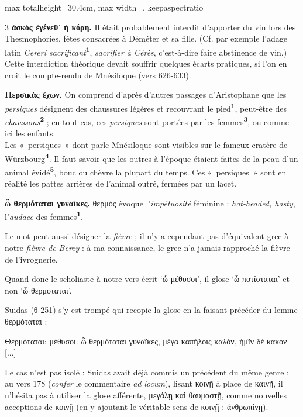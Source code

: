 \documentclass[11pt,twoside]{book}
\newcommand{\italique}[1]{\textit{#1}}
\newcommand{\citComm}[1]{\begin{quoting}[vskip=0.4pt,leftmargin=0.7em,rightmargin=0.2em]#1\end{quoting}}
\newcommand{\latin}[1]{\textit{#1}}
\newcommand{\anglais}[1]{\textit{#1}}
\newcommand{\marqueur}[1]{\textsuperscript{\color{rubricRed}\textbf{#1}}}
\begin{document}
\begin{adjustbox}{max totalheight=30.4cm, max width=\textwidth, keepaspectratio}
\begin{minipage}{\textwidth}
{\begin{multicols}{3}
 \textbf{ἀσκὸς ἐγένεθ᾽ ἡ κόρη.} Il était probablement interdit d'apporter du vin lors des Thesmophories, fêtes consacrées à Déméter et sa fille. (Cf. par exemple l'adage latin \latin{Cereri sacrificant}\marqueur{1}, \italique{sacrifier à Cérès}, c'est-à-dire faire abstinence de vin.) Cette interdiction théorique devait souffrir quelques écarts pratiques, si l'on en croit le compte-rendu de Mnésiloque (vers 626-633).
\par\vspace{1.5pt}
 \textbf{Περσικὰς ἔχων.} On comprend d'après d'autres passages d'Aristophane que les \italique{persiques} désignent des chaussures légères et recouvrant le pied\marqueur{1}, peut-être des \italique{chaussons}\marqueur{2} ; en tout cas, ces \italique{persiques} sont portées par les femmes\marqueur{3}, ou comme ici les enfants.\\ Les «~persiques~» dont parle Mnésiloque sont visibles sur le fameux cratère de Würzbourg\marqueur{4}. Il faut savoir que les outres à l'époque étaient faites de la peau d'un animal évidé\marqueur{5}, bouc ou chèvre la plupart du temps. Ces «~persiques~» sont en réalité les pattes arrières de l'animal outré, fermées par un lacet.
\par\vspace{1.5pt}
 \textbf{ὦ θερμόταται γυναῖκες.} θερμός évoque l'\italique{impétuosité} féminine : \anglais{hot-headed, hasty}, l'\italique{audace} des femmes\marqueur{1}.
\par\vspace{1.5pt}
\noindent Le mot peut aussi désigner la \italique{fièvre} ; il n'y a cependant pas d'équivalent grec à notre \italique{fièvre de Bercy} : à ma connaissance, le grec n'a jamais rapproché la fièvre de l'ivrognerie.
\par\vspace{1.5pt}
\noindent Quand donc le scholiaste à notre vers écrit `ὦ μέθυσοι', il glose `ὦ ποτίσταται' et non `ὦ θερμόταται'.
\par\vspace{1.5pt}
\noindent Suidas (θ 251) s'y est trompé qui recopie la glose en la faisant précéder du lemme θερμόταται :
\citComm{Θερμόταται: μέθυσοι. ὦ θερμόταται γυναῖκες, μέγα καπήλοις καλόν, ἡμῖν δὲ κακόν [...]}
\par\vspace{1.5pt}
\noindent Le cas n'est pas isolé : Suidas avait déjà commis un précédent du même genre : au vers 178 (\italique{confer} le commentaire \italique{ad locum}), lisant κοινῇ à place de καινῇ, il n'hésita pas à utiliser la glose afférente, μεγάλῃ καὶ θαυμαστῇ, comme nouvelles acceptions de κοινῇ (en y ajoutant le véritable sens de κοινῇ : ἀνθρωπίνῃ).

\end{multicols}}
\end{minipage}
\end{adjustbox}
\end{document}
